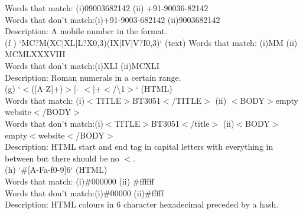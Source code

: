 \documentclass[8pt,a4paper]{article}
\begin{document}
Words that match: (i)09003682142 (ii) +91-90036-82142\\
Words that don't match:(i)+91-9003-682142 (ii)9003682142\\
Description: A mobile number in the format.\\
(f ) `MC?M(XC|XL|L?X{0,3})(IX|IV|V?I{0,3})` (text)
Words that match: (i)MM (ii) MCMLXXXVIII\\
Words that don't match:(i)XLI (ii)MCXLI\\
Description: Roman numerals in a certain range.\\
(g) `$<$([A-Z]+)$>$[ $\widehat{   }$ $<$]+$<$/\textbackslash1$>$` (HTML)\\
Words that match: (i)$<$TITLE$>$BT3051$<$/TITLE$>$ (ii) $<$BODY$>$empty website$<$/BODY$>$\\
Words that don't match:(i)$<$TITLE$>$BT3051$<$/title$>$ (ii)$<$BODY$>$empty$<$website$<$/BODY$>$\\
Description: HTML start and end tag in capital letters with everything in between but there should be no $<$.\\
(h) `\#[A-Fa-f0-9]{6}` (HTML)\\
Words that match: (i)\#000000 (ii) \#ffffff\\
Words that don't match:(i)\#00000 (ii)\#fffff\\
Description: HTML colours in 6 character hexadecimal preceded by a hash.
\end{document}
